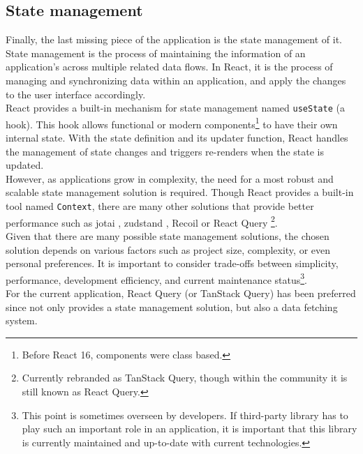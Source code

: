 \documentclass[./memory.tex]{subfiles}
\begin{document}
\subsection{State management}
Finally, the last missing piece of the application is the state management of it.
State management is the process of maintaining the information of an application's
across multiple related data flows. In React, it is the process of managing and
synchronizing data within an application, and apply the changes to the user
interface accordingly.
\\[8pt]
React provides a built-in mechanism for state management named
\texttt{useState} (a hook). This hook allows functional or modern
components\footnote{Before React 16, components were class based.} to have their
own internal state. With the state definition and its updater function, React
handles the management of state changes and triggers re-renders when the state
is updated.
\\
However, as applications grow in complexity, the need for a most robust and
scalable state management solution is required. Though React provides a built-in
tool named \texttt{Context}, there are many other solutions that provide better
performance such as jotai \cite{jotai}, zudstand \cite{zudstand}, Recoil \cite{recoil}
or React Query \cite{react-query}\footnote{Currently rebranded as TanStack Query,
	though within the community it is still known as React Query.}.
\\[8pt]
Given that there are many possible state management solutions, the chosen
solution depends on various factors such as project size, complexity, or even
personal preferences. It is important to consider trade-offs between simplicity,
performance, development efficiency, and current maintenance
status\footnote{This point is sometimes overseen by developers. If third-party
	library has to play such an important role in an application, it is important
	that this library is currently maintained and up-to-date with current
	technologies.}.
\\[8pt]
For the current application, React Query (or TanStack Query) has been preferred
since not only provides a state management solution, but also a data fetching
system.
\end{document}
